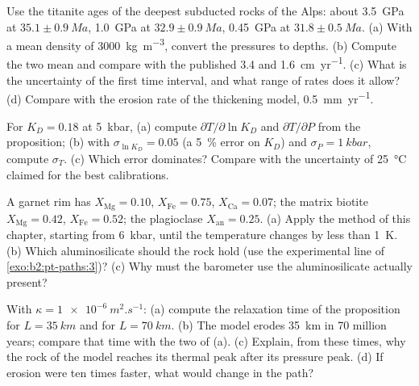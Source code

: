 \begin{exercise}[$\star\star$]\label{exo:b2:pt-paths:8}
Use the titanite ages of the deepest subducted rocks of the Alps: about \qty{3.5}{GPa} at
$35.1 \pm \qty{0.9}{Ma}$, \qty{1.0}{GPa} at $32.9 \pm \qty{0.9}{Ma}$, \qty{0.45}{GPa} at
$31.8 \pm \qty{0.5}{Ma}$. (a) With a mean density of \qty{3000}{kg.m^{-3}}, convert the
pressures to depths. (b) Compute the two mean  and compare with the
published 3.4 and \qty{1.6}{cm.yr^{-1}}. (c) What is the uncertainty of the first time
interval, and what range of rates does it allow? (d) Compare with the erosion rate of
the thickening model, \qty{0.5}{mm.yr^{-1}}.
\end{exercise}

\begin{exercise}[$\star\star$]\label{exo:b2:pt-paths:9}
For $K_D = 0.18$ at \qty{5}{kbar}, (a) compute $\partial T/\partial\ln K_D$ and
$\partial T/\partial P$ from the proposition; (b) with $\sigma_{\ln K_D} = 0.05$ (a
\qty{5}{\percent} error on $K_D$) and $\sigma_P = \qty{1}{kbar}$, compute $\sigma_T$.
(c) Which error dominates? Compare with the uncertainty of \qty{25}{\celsius} claimed for
the best calibrations.
\end{exercise}

\begin{exercise}[$\star\star\star$]\label{exo:b2:pt-paths:10}
A garnet rim has $X_{\text{Mg}} = 0.10$, $X_{\text{Fe}} = 0.75$, $X_{\text{Ca}} = 0.07$;
the matrix biotite $X_{\text{Mg}} = 0.42$, $X_{\text{Fe}} = 0.52$; the plagioclase
$X_{\text{an}} = 0.25$. (a) Apply the method of this chapter, starting from \qty{6}{kbar},
until the temperature changes by less than \qty{1}{K}. (b) Which aluminosilicate should
the rock hold (use the experimental line of \cref{exo:b2:pt-paths:3})? (c) Why must the barometer use
the aluminosilicate actually present?
\end{exercise}

\begin{exercise}[$\star\star\star$]\label{exo:b2:pt-paths:11}
With $\kappa = \qty{1e-6}{m^2.s^{-1}}$: (a) compute the relaxation time of the
proposition for $L = \qty{35}{km}$ and for $L = \qty{70}{km}$. (b) The model erodes
\qty{35}{km} in 70 million years; compare that time with the two of (a). (c) Explain,
from these times, why the rock of the model reaches its thermal peak after its pressure
peak. (d) If erosion were ten times faster, what would change in the path?
\end{exercise}


